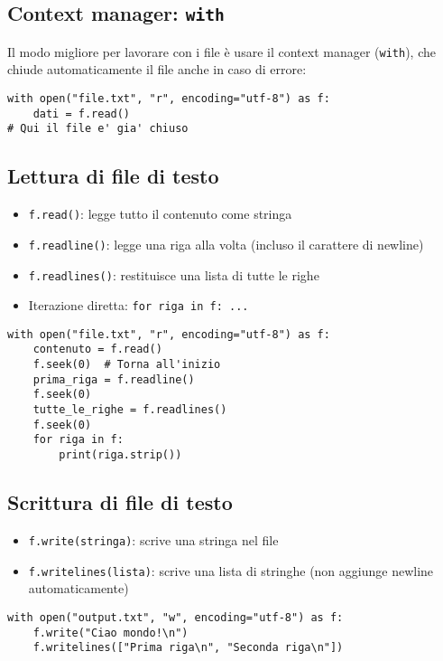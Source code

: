 \documentclass[a4paper,12pt]{article}
\begin{document}
\subsection*{Context manager: \texttt{with}}
Il modo migliore per lavorare con i file è usare il context manager (\texttt{with}), che chiude automaticamente il file anche in caso di errore:
\begin{lstlisting}
with open("file.txt", "r", encoding="utf-8") as f:
    dati = f.read()
# Qui il file e' gia' chiuso
\end{lstlisting}

\subsection*{Lettura di file di testo}
\begin{itemize}
    \item \texttt{f.read()}: legge tutto il contenuto come stringa
    \item \texttt{f.readline()}: legge una riga alla volta (incluso il carattere di newline)
    \item \texttt{f.readlines()}: restituisce una lista di tutte le righe
    \item Iterazione diretta: \texttt{for riga in f: ...}
\end{itemize}
\begin{lstlisting}
with open("file.txt", "r", encoding="utf-8") as f:
    contenuto = f.read()
    f.seek(0)  # Torna all'inizio
    prima_riga = f.readline()
    f.seek(0)
    tutte_le_righe = f.readlines()
    f.seek(0)
    for riga in f:
        print(riga.strip())
\end{lstlisting}

\subsection*{Scrittura di file di testo}
\begin{itemize}
    \item \texttt{f.write(stringa)}: scrive una stringa nel file
    \item \texttt{f.writelines(lista)}: scrive una lista di stringhe (non aggiunge newline automaticamente)
\end{itemize}
\begin{lstlisting}
with open("output.txt", "w", encoding="utf-8") as f:
    f.write("Ciao mondo!\n")
    f.writelines(["Prima riga\n", "Seconda riga\n"])
\end{lstlisting}
\end{document}
